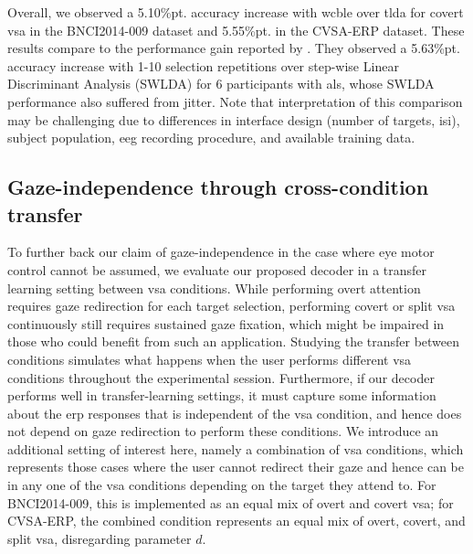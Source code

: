 Overall, we observed a 5.10\%pt. accuracy increase with \ac{wcble} over
\ac{tlda} for covert \ac{vsa} in the BNCI2014-009 dataset and 5.55\%pt. in the CVSA-ERP dataset.
These results compare to the performance gain reported by \textcite{Zisk2022}.
They observed a 5.63\%pt. accuracy increase with 1-10 selection repetitions over
step-wise Linear Discriminant Analysis  (SWLDA) for 6 participants with
\ac{als}, whose SWLDA performance also suffered from jitter.
Note that interpretation of this comparison may be challenging due to differences in
interface design (number of targets, \ac{isi}), subject population,
\ac{eeg} recording procedure, and available training data.

\subsection{Gaze-independence through cross-condition transfer}
\label{sec:covert-align/results/cross}
To further back our claim of gaze-independence in the case where eye motor
control cannot be assumed, we evaluate our proposed decoder in a transfer
learning setting between \ac{vsa} conditions.
While performing overt attention requires gaze redirection for each target
selection, performing covert or split \ac{vsa} continuously still requires
sustained gaze fixation, which might be impaired in those who
could benefit from such an application.
Studying the transfer between conditions simulates what happens
when the user performs different \ac{vsa} conditions throughout the
experimental session.
Furthermore, if our decoder performs well in transfer-learning settings,
it must capture some information about the \ac{erp} responses that is independent of
the \ac{vsa} condition, and hence does not depend on gaze redirection to perform
these conditions.
We introduce an additional setting of interest here, namely a combination of \ac{vsa}
conditions, which represents those cases where the user cannot
redirect their gaze and hence can be in any one of the \ac{vsa} conditions depending on the
target they attend to.
For BNCI2014-009, this is implemented as an equal mix of overt and
covert \ac{vsa}; for CVSA-ERP, the combined condition represents an equal mix of overt,
covert, and split \ac{vsa}, disregarding parameter $d$.

